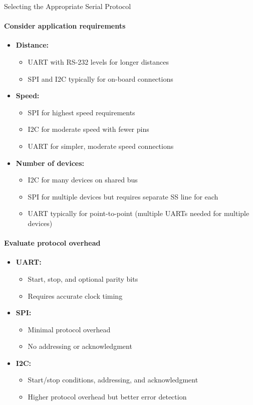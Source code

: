\begin{KR}{Selecting the Appropriate Serial Protocol}
\paragraph{Consider application requirements}
\begin{itemize}
    \item \textbf{Distance:}
    \begin{itemize}
        \item UART with RS-232 levels for longer distances
        \item SPI and I2C typically for on-board connections
    \end{itemize}
    \item \textbf{Speed:}
    \begin{itemize}
        \item SPI for highest speed requirements
        \item I2C for moderate speed with fewer pins
        \item UART for simpler, moderate speed connections
    \end{itemize}
    \item \textbf{Number of devices:}
    \begin{itemize}
        \item I2C for many devices on shared bus
        \item SPI for multiple devices but requires separate SS line for each
        \item UART typically for point-to-point (multiple UARTs needed for multiple devices)
    \end{itemize}
\end{itemize}

\paragraph{Evaluate protocol overhead}
\begin{itemize}
    \item \textbf{UART:}
    \begin{itemize}
        \item Start, stop, and optional parity bits
        \item Requires accurate clock timing
    \end{itemize}
    \item \textbf{SPI:}
    \begin{itemize}
        \item Minimal protocol overhead
        \item No addressing or acknowledgment
    \end{itemize}
    \item \textbf{I2C:}
    \begin{itemize}
        \item Start/stop conditions, addressing, and acknowledgment
        \item Higher protocol overhead but better error detection
    \end{itemize}
\end{itemize}


\end{KR}
